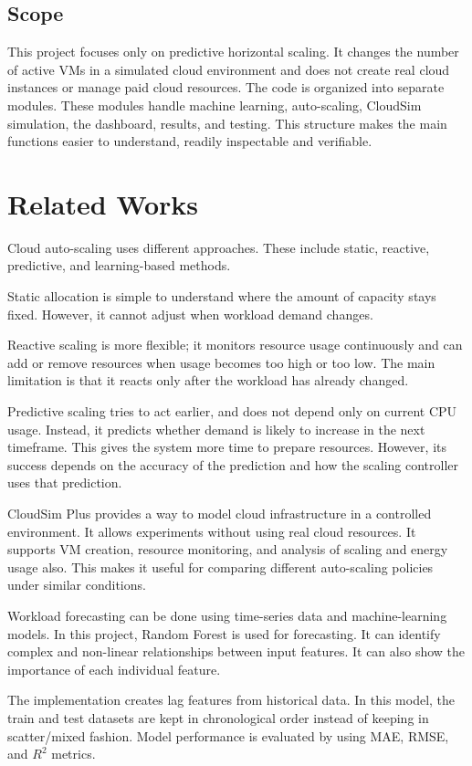 \documentclass[10pt,journal,compsoc]{IEEEtran}
\begin{document}
\subsection{Scope}
This project focuses only on predictive horizontal scaling. It changes the number of active VMs in a simulated cloud environment and does not create real cloud instances or manage paid cloud resources. The code is organized into separate modules. These modules handle machine learning, auto-scaling, CloudSim simulation, the dashboard, results, and testing. This structure makes the main functions easier to understand, readily inspectable and verifiable.

\section{Related Works}
Cloud auto-scaling uses different approaches. These include static, reactive, predictive, and learning-based methods.

Static allocation is simple to understand where the amount of capacity stays fixed. However, it cannot adjust when workload demand changes.

Reactive scaling is more flexible; it monitors resource usage continuously and can add or remove resources when usage becomes too high or too low. The main limitation is that it reacts only after the workload has already changed.

Predictive scaling tries to act earlier, and does not depend only on current CPU usage. Instead, it predicts whether demand is likely to increase in the next timeframe. This gives the system more time to prepare resources. However, its success depends on the accuracy of the prediction and how the scaling controller uses that prediction.

CloudSim Plus provides a way to model cloud infrastructure in a controlled environment. It allows experiments without using real cloud resources. It supports VM creation, resource monitoring, and analysis of scaling and energy usage also. This makes it useful for comparing different auto-scaling policies under similar conditions.

Workload forecasting can be done using time-series data and machine-learning models. In this project, Random Forest is used for forecasting. It can identify complex and non-linear relationships between input features. It can also show the importance of each individual feature.

The implementation creates lag features from historical data. In this model, the train and test datasets are kept in chronological order instead of keeping in scatter/mixed fashion. Model performance is evaluated by using MAE, RMSE, and $R^2$ metrics.
\end{document}

